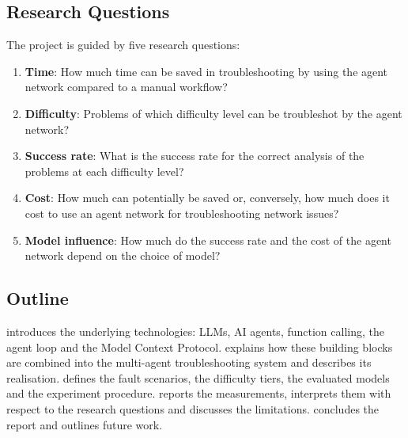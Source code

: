 \subsection{Research Questions}
\label{sec:research-questions}

The project is guided by five research questions:

\begin{enumerate}
  \item \textbf{Time}: How much time can be saved in troubleshooting by using the
        agent network compared to a manual workflow?
  \item \textbf{Difficulty}: Problems of which difficulty level can be
        troubleshot by the agent network?
  \item \textbf{Success rate}: What is the success rate for the correct analysis
        of the problems at each difficulty level?
  \item \textbf{Cost}: How much can potentially be saved or, conversely, how
        much does it cost to use an agent network for troubleshooting network
        issues?
  \item \textbf{Model influence}: How much do the success rate and the cost of
        the agent network depend on the choice of model?
\end{enumerate}


\subsection{Outline}

 introduces the underlying technologies: LLMs, AI agents,
function calling, the agent loop and the Model Context Protocol.
 explains how these building blocks are combined into the
multi-agent troubleshooting system and  describes its
realisation.  defines the fault scenarios, the
difficulty tiers, the evaluated models and the experiment procedure.
 reports the measurements, interprets
them with respect to the research questions and discusses the limitations.
 concludes the report and outlines future work.